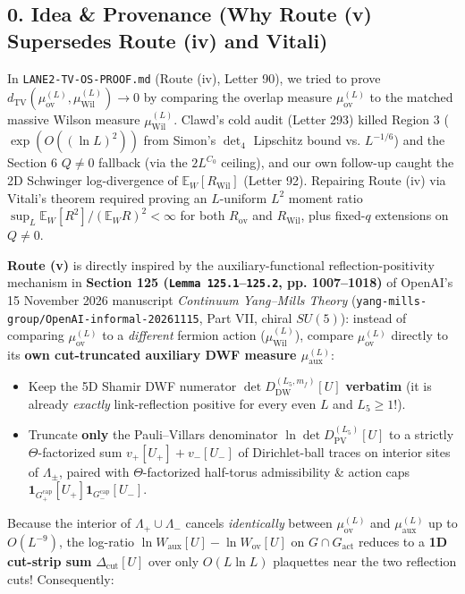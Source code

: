 \documentclass[11pt,a4paper]{article}
\begin{document}
\subsection*{0. Idea \& Provenance (Why Route (v) Supersedes Route (iv) and Vitali)}
In \texttt{LANE2-TV-OS-PROOF.md} (Route (iv), Letter 90), we tried to prove $d_{\text{TV}}(\mu_{\text{ov}}^{(L)}, \mu_{\text{Wil}}^{(L)}) \to 0$ by comparing the overlap measure $\mu_{\text{ov}}^{(L)}$ to the matched massive Wilson measure $\mu_{\text{Wil}}^{(L)}$. Clawd's cold audit (Letter 293) killed Region 3 ($\exp(O((\ln L)^2))$ from Simon's $\det_4$ Lipschitz bound vs. $L^{-1/6}$) and the Section 6 $Q \ne 0$ fallback (via the $2 L^{C_0}$ ceiling), and our own follow-up caught the 2D Schwinger log-divergence of $\mathbb{E}_W[R_{\text{Wil}}]$ (Letter 92). Repairing Route (iv) via Vitali's theorem required proving an $L$-uniform $L^2$ moment ratio $\sup_L \mathbb{E}_W[R^2]/(\mathbb{E}_W R)^2 < \infty$ for both $R_{\text{ov}}$ and $R_{\text{Wil}}$, plus fixed-$q$ extensions on $Q \ne 0$.

{\bfseries\boldmath Route (v)} is directly inspired by the auxiliary-functional reflection-positivity mechanism in {\bfseries\boldmath Section 125 (\texttt{Lemma 125.1}--\texttt{125.2}, pp. 1007--1018)} of OpenAI's 15 November 2026 manuscript \emph{Continuum Yang--Mills Theory} (\texttt{yang-mills-group/\allowbreak{}OpenAI-informal-20261115}, Part VII, chiral $SU(5)$): instead of comparing $\mu_{\text{ov}}^{(L)}$ to a \emph{different} fermion action ($\mu_{\text{Wil}}^{(L)}$), compare $\mu_{\text{ov}}^{(L)}$ directly to its {\bfseries\boldmath own cut-truncated auxiliary DWF measure $\mu_{\text{aux}}^{(L)}$}:

\begin{itemize}
\item{} Keep the 5D Shamir DWF numerator $\det D_{\text{DW}}^{(L_5, m_f)}[U]$ {\bfseries\boldmath verbatim} (it is already \emph{exactly} link-reflection positive for every even $L$ and $L_5 \ge 1$!).
\item{} Truncate {\bfseries\boldmath only} the Pauli--Villars denominator $\ln \det D_{\text{PV}}^{(L_5)}[U]$ to a strictly $\Theta$-factorized sum $v_+[U_+] + v_-[U_-]$ of Dirichlet-ball traces on interior sites of $\Lambda_\pm$, paired with $\Theta$-factorized half-torus admissibility \& action caps $\mathbf{1}_{G_+^{\text{cap}}}[U_+] \mathbf{1}_{G_-^{\text{cap}}}[U_-]$.
\end{itemize}

Because the interior of $\Lambda_+ \cup \Lambda_-$ cancels \emph{identically} between $\mu_{\text{ov}}^{(L)}$ and $\mu_{\text{aux}}^{(L)}$ up to $O(L^{-9})$, the log-ratio $\ln W_{\text{aux}}[U] - \ln W_{\text{ov}}[U]$ on $G \cap G_{\text{act}}$ reduces to a {\bfseries\boldmath 1D cut-strip sum} $\Delta_{\text{cut}}[U]$ over only $O(L \ln L)$ plaquettes near the two reflection cuts! Consequently:
\end{document}
